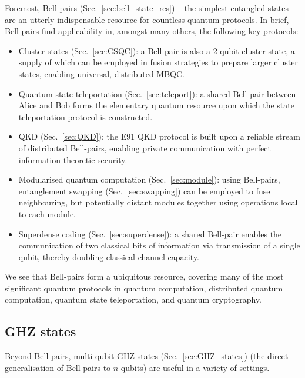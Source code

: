 Foremost, Bell-pairs (Sec.~\ref{sec:bell_state_res}) -- the simplest entangled states -- are an utterly indispensable resource for countless quantum protocols. In brief, Bell-pairs find applicability in, amongst many others, the following key protocols:
\begin{itemize}
\item Cluster states (Sec.~\ref{sec:CSQC}): a Bell-pair is also a 2-qubit cluster state, a supply of which can be employed in fusion strategies to prepare larger cluster states, enabling universal, distributed MBQC.
\item Quantum state teleportation (Sec.~\ref{sec:teleport}): a shared Bell-pair between Alice and Bob forms the elementary quantum resource upon which the state teleportation protocol is constructed.
\item QKD (Sec.~\ref{sec:QKD}): the E91 QKD protocol is built upon a reliable stream of distributed Bell-pairs, enabling private communication with perfect information theoretic security.
\item Modularised quantum computation (Sec.~\ref{sec:module}): using Bell-pairs, entanglement swapping (Sec.~\ref{sec:swapping}) can be employed to fuse neighbouring, but potentially distant modules together using operations local to each module.
\item Superdense coding (Sec.~\ref{sec:superdense}): a shared Bell-pair enables the communication of two classical bits of information via transmission of a single qubit, thereby doubling classical channel capacity.
\end{itemize}

We see that Bell-pairs form a ubiquitous resource, covering many of the most significant quantum protocols in quantum computation, distributed quantum computation, quantum state teleportation, and quantum cryptography.

%
%

\subsection{GHZ states}

Beyond Bell-pairs, multi-qubit GHZ states (Sec.~\ref{sec:GHZ_states}) (the direct generalisation of Bell-pairs to $n$ qubits) are useful in a variety of settings.

